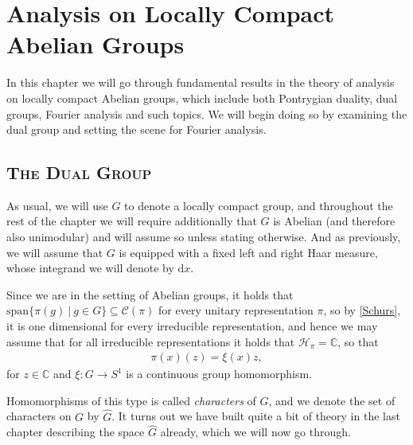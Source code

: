 \documentclass[10pt,twoside,openany,final]{memoir}
\newcommand{\sssection}[1]{%
\section[#1]{\centering\normalfont\scshape \textbf{#1}}}
\theoremstyle{definition}
\theoremstyle{Break}
\newcommand{\C}{\mathbb{C}}
\renewcommand{\H}{\mathcal{H}}
\renewcommand{\d}{\mathrm{d}}
\begin{document}
\chapter{Analysis on Locally Compact Abelian Groups}
In this chapter we will go through fundamental results in the theory of analysis on locally compact Abelian groups, which include both Pontrygian duality, dual groups, Fourier analysis and such topics. We will begin doing so by examining the dual group and setting the scene for Fourier analysis.
\sssection{The Dual Group}
As usual, we will use $G$ to denote a locally compact group, and throughout the rest of the chapter we will require additionally that $G$ is Abelian (and therefore also unimodular) and will assume so unless stating otherwise. And as previously, we will assume that $G$ is equipped with a fixed left and right Haar measure, whose integrand we will denote by $\d x$.

Since we are in the setting of Abelian groups, it holds that $\mathrm{span}\{\pi(g) \ \big| \ g \in G\} \subseteq \mathcal{C}(\pi)$ for every unitary representation $\pi$, so by \ref{Schurs}, it is one dimensional for every irreducible representation, and hence we may assume that for all irreducible representations it holds that $\H_\pi =\C$, so that
\begin{align}
	\pi(x) (z)=\xi(x) z,
	\label{irredab}
\end{align}
for $z \in \C$ and $\xi \colon G \to S^1$ is a continuous group homomorphism.

Homomorphisms of this type is called \emph{characters} of $G$, and we denote the set of characters on $G$ by $\widehat{G}$. It turns out we have built quite a bit of theory in the last chapter describing the space $\widehat{G}$ already, which we will now go through.
\end{document}
